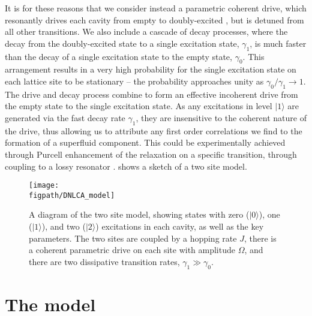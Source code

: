 It is for these reasons that we consider instead a parametric coherent drive, which resonantly drives each cavity from empty to doubly-excited \cite{Ma2017,Savona2017}, but is detuned from all other transitions. We also include a cascade of decay processes, where the decay from the doubly-excited state to a single excitation state, \(\gamma_{1}\), is much faster than the decay of a single excitation state to the empty state, \(\gamma_{0}\). This arrangement results in a very high probability for the single excitation state on each lattice site to be stationary -- the probability approaches unity as \(\gamma_{0}/\gamma_{1} \rightarrow 1\). The drive and decay process combine to form an effective incoherent drive from the empty state to the single excitation state. As any excitations in level \(|1\rangle\) are generated via the fast decay rate \(\gamma_{1}\), they are insensitive to the coherent nature of the drive, thus allowing us to attribute any first order correlations we find to the formation of a superfluid component. This could be experimentally achieved through Purcell enhancement \cite{Purcell1946,Fox_Purcell} of the relaxation on a specific transition, through coupling to a lossy resonator \cite{Bienfait2016}.  shows a sketch of a two site model.

\begin{figure}[ht!]
\centering
\texttt{[image: \\figpath/DNLCA\_model]}
\caption{\label{fig:dnlca1-1}A diagram of the two site model, showing states with zero (\(|0\rangle\)), one (\(|1\rangle\)), and two (\(|2\rangle\)) excitations in each cavity, as well as the key parameters. The two sites are coupled by a hopping rate \(J\), there is a coherent parametric drive on each site with amplitude \(\Omega\), and there are two dissipative transition rates, \(\gamma_{1} \gg \gamma_{0}\).}
\end{figure}

\section{The model}

